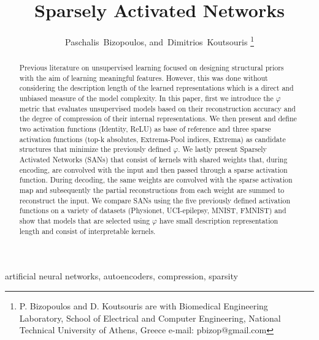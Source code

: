 \documentclass[journal]{IEEEtran}
\providecommand{\FILEPATH}{.}
\begin{document}
\DTLloaddb{keys-values}{\FILEPATH/keys-values.csv}
\title{Sparsely Activated Networks}
\author{Paschalis~Bizopoulos, and~Dimitrios~Koutsouris
  \thanks{P. Bizopoulos and D. Koutsouris are with Biomedical
    Engineering Laboratory, School of Electrical and Computer
    Engineering, National Technical University of Athens, Greece e-mail:
pbizop@gmail.com}}
\maketitle
\begin{abstract}
  Previous literature on unsupervised learning focused on designing
  structural priors with the aim of learning meaningful features.
  However, this was done without considering the description length
  of the learned representations which is a direct and unbiased
  measure of the model complexity.
  In this paper, first we introduce the $\varphi$ metric that
  evaluates unsupervised models based on their reconstruction
  accuracy and the degree of compression of their internal representations.
  We then present and define two activation functions (Identity,
  ReLU) as base of reference and three sparse activation functions
  (top-k absolutes, Extrema-Pool indices, Extrema) as candidate
  structures that minimize the previously defined $\varphi$.
  We lastly present Sparsely Activated Networks (SANs) that consist
  of kernels with shared weights that, during encoding, are convolved
  with the input and then passed through a sparse activation function.
  During decoding, the same weights are convolved with the sparse
  activation map and subsequently the partial reconstructions from
  each weight are summed to reconstruct the input.
  We compare SANs using the five previously defined activation
  functions on a variety of datasets (Physionet, UCI-epilepsy, MNIST,
  FMNIST) and show that models that are selected using $\varphi$ have
  small description representation length and consist of interpretable kernels.
\end{abstract}
\begin{IEEEkeywords}
  artificial neural networks, autoencoders, compression, sparsity
\end{IEEEkeywords}
\end{document}
